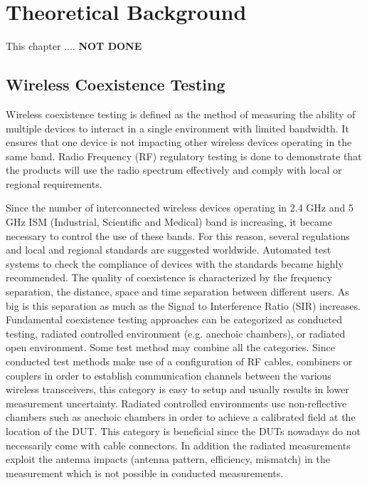 \chapter{Theoretical Background} \label{chap:2}
This chapter .... \textbf{NOT DONE}
\section{Wireless Coexistence Testing}

Wireless coexistence testing is defined as the method of measuring the ability of multiple devices to interact in a single environment with limited bandwidth. It ensures that one device is not impacting other wireless devices operating in the same band. Radio Frequency (RF) regulatory testing is done to demonstrate that the products will use the radio spectrum effectively and comply with local or regional requirements. 

Since the number of interconnected wireless devices operating in 2.4 GHz and 5 GHz ISM (Industrial, Scientific and Medical) band is increasing, it became necessary to control the use of these bands. For this reason, several regulations and local and regional standards are suggested worldwide. Automated test systems to check the compliance of devices with the standards became highly recommended. The quality of coexistence is characterized by the frequency separation, the distance, space and time separation between different users. As big is this separation as much as the Signal to Interference Ratio (SIR) increases. Fundamental coexistence testing approaches can be categorized as conducted testing, radiated controlled environment (e.g. anechoic chambers), or radiated open environment. Some test method may combine all the categories.
Since conducted test methods make use of a configuration of RF cables, combiners or couplers in order to establish communication channels between the various wireless transceivers, this category is easy to setup and usually results in lower measurement uncertainty.
Radiated controlled environments use non-reflective chambers such as anechoic chambers in order to achieve a calibrated field at the location of the DUT. This category is beneficial since the DUTs nowadays do not necessarily come with cable connectors. In addition the radiated measurements exploit the antenna impacts (antenna pattern, efficiency, mismatch) in the measurement which is not possible in conducted measurements.

